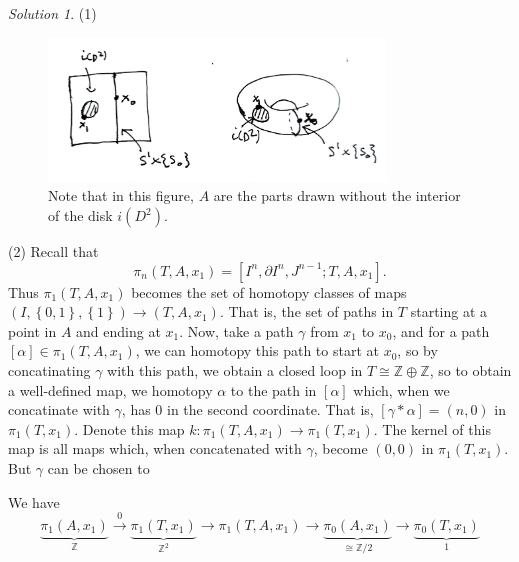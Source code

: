\documentclass[reqno]{amsart}
\theoremstyle{definition}
\theoremstyle{remark}
\newtheorem*{solution}{Solution}
\begin{document}
    \begin{solution}
        (1) 
        \begin{figure}[htpb]
            \centering
            \includegraphics[width=0.8\textwidth]{p11.jpeg}
            \caption{Note that 
            in this figure, $A$ are the parts drawn
        without the interior of the disk $i(D^2)$.}
            \label{fig:p11-jpeg}
        \end{figure}

        (2)
        Recall that
        \[
        \pi_n (T,A,x_1) =
        \left[ I^{n},\partial I^{n},
        J^{n-1}; T,A, x_1 \right] .
        \] 
        Thus $\pi_1 \left( T,A,x_1 \right) $ becomes
        the set of homotopy classes
        of maps
        $\left( I, \left\{ 0,1 \right\} , \left\{ 1 \right\} 
        \right) \to \left( T,A,x_1 \right)$. That is, the
        set of paths in $T$ starting at a point in $A$ and
        ending at $x_1$.
        Now, take a path $\gamma$ from
        $x_1$ to $x_0$, and for
        a path $\left[ \alpha \right]  \in 
        \pi_1 \left( T,A,x_1 \right) $, we
        can homotopy this path to start at
        $x_0$, so by
        concatinating $\gamma$ with this path, we
        obtain a closed loop in $T \cong \mathbb{Z} \oplus \mathbb{Z}$,
        so to obtain a well-defined map, we homotopy $\alpha$ to
        the path in $\left[ \alpha \right] $ which, when
        we concatinate with $\gamma$, has
        $0$ in the second coordinate. That is,
        $\left[ \gamma * \alpha \right] =
        \left( n,0 \right) $ in
        $\pi_1 \left( T,x_1 \right) $. Denote this
        map $k \colon \pi_1 \left( T,A,x_1 \right) 
        \to \pi_1 \left( T,x_1 \right) $.
        The kernel of this map is all maps
        which, when concatenated with $\gamma$, become
        $\left( 0,0 \right) $ in
        $\pi_1 \left( T,x_1 \right) $. But $\gamma$ can
        be chosen to 


        We have
        \[
            \underbrace{\pi_1(A,x_1)}_{\mathbb{Z}} 
            \stackrel{0}{\to} 
        \underbrace{\pi_1 (T, x_1)}_{\mathbb{Z}^2} \to 
        \pi_1 \left( T,A,x_1 \right) 
        \to \underbrace{\pi_0 (A,x_1)}_{\cong \mathbb{Z}/2}
        \to \underbrace{\pi_0 (T,x_1)}_{1}
        \] 


\end{solution}
\end{document}
